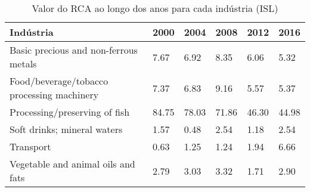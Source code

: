 \begin{table}
\centering
\caption{Valor do RCA ao longo dos anos para cada indústria (ISL)}
\label{tab:ex3-tempo-ISL}
\begin{tabular}{p{6cm}p{1.5cm}p{1.5cm}p{1.5cm}p{1.5cm}p{1.5cm}}
\toprule
                                 Indústria &  2000 &  2004 &  2008 &  2012 &  2016 \\
\midrule
     Basic precious and non-ferrous metals &  7.67 &  6.92 &  8.35 &  6.06 &  5.32 \\
Food/beverage/tobacco processing machinery &  7.37 &  6.83 &  9.16 &  5.57 &  5.37 \\
             Processing/preserving of fish & 84.75 & 78.03 & 71.86 & 46.30 & 44.98 \\
               Soft drinks; mineral waters &  1.57 &  0.48 &  2.54 &  1.18 &  2.54 \\
                                 Transport &  0.63 &  1.25 &  1.24 &  1.94 &  6.66 \\
        Vegetable and animal oils and fats &  2.79 &  3.03 &  3.32 &  1.71 &  2.90 \\
\bottomrule
\end{tabular}
\end{table}
